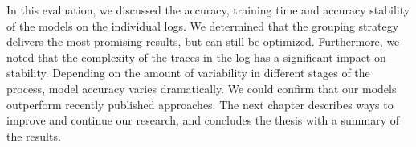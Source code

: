 In this evaluation, we discussed the accuracy, training time and accuracy stability of the models on the individual logs.
We determined that the grouping strategy delivers the most promising results, but can still be optimized.
Furthermore, we noted that the complexity of the traces in the log has a significant impact on stability.
Depending on the amount of variability in different stages of the process, model accuracy varies dramatically.
We could confirm that our models outperform recently published approaches.
The next chapter describes ways to improve and continue our research, and concludes the thesis with a summary of the results.
